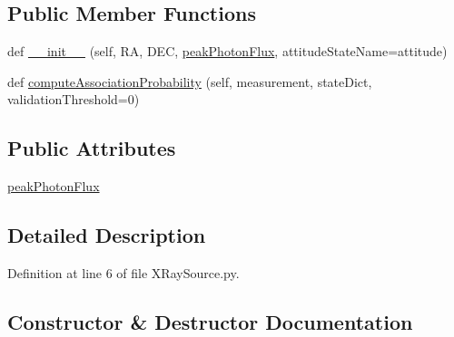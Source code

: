 \subsection*{Public Member Functions}
\begin{DoxyCompactItemize}
\item 
def \hyperlink{classmodest_1_1signals_1_1XRaySource_1_1StaticXRayPointSource_a45201ec6e1bc7fddcadf6900cda9f859}{\+\_\+\+\_\+init\+\_\+\+\_\+} (self, RA, D\+EC, \hyperlink{classmodest_1_1signals_1_1XRaySource_1_1StaticXRayPointSource_a3d2fa8839fd1c39cfb115be825da90a8}{peak\+Photon\+Flux}, attitude\+State\+Name=\textquotesingle{}attitude\textquotesingle{})
\item 
def \hyperlink{classmodest_1_1signals_1_1XRaySource_1_1StaticXRayPointSource_a7814f37364bfc3cb3983c62f46c6430f}{compute\+Association\+Probability} (self, measurement, state\+Dict, validation\+Threshold=0)
\end{DoxyCompactItemize}
\subsection*{Public Attributes}
\begin{DoxyCompactItemize}
\item 
\hyperlink{classmodest_1_1signals_1_1XRaySource_1_1StaticXRayPointSource_a3d2fa8839fd1c39cfb115be825da90a8}{peak\+Photon\+Flux}
\end{DoxyCompactItemize}


\subsection{Detailed Description}


Definition at line 6 of file X\+Ray\+Source.\+py.



\subsection{Constructor \& Destructor Documentation}
